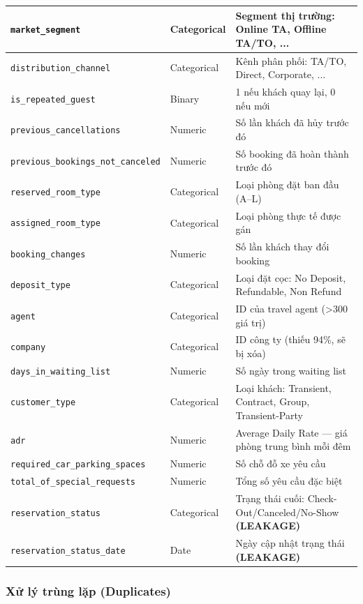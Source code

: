 \documentclass[12pt, a4paper]{article}
\begin{document}
\begin{longtable}{|l|l|p{7cm}|}
\texttt{market\_segment} & Categorical & Segment thị trường: Online TA, Offline TA/TO, ... \\ \hline
\texttt{distribution\_channel} & Categorical & Kênh phân phối: TA/TO, Direct, Corporate, ... \\ \hline
\texttt{is\_repeated\_guest} & Binary & 1 nếu khách quay lại, 0 nếu mới \\ \hline
\texttt{previous\_cancellations} & Numeric & Số lần khách đã hủy trước đó \\ \hline
\texttt{previous\_bookings\_not\_canceled} & Numeric & Số booking đã hoàn thành trước đó \\ \hline
\texttt{reserved\_room\_type} & Categorical & Loại phòng đặt ban đầu (A--L) \\ \hline
\texttt{assigned\_room\_type} & Categorical & Loại phòng thực tế được gán \\ \hline
\texttt{booking\_changes} & Numeric & Số lần khách thay đổi booking \\ \hline
\texttt{deposit\_type} & Categorical & Loại đặt cọc: No Deposit, Refundable, Non Refund \\ \hline
\texttt{agent} & Categorical & ID của travel agent (>300 giá trị) \\ \hline
\texttt{company} & Categorical & ID công ty (thiếu 94\%, sẽ bị xóa) \\ \hline
\texttt{days\_in\_waiting\_list} & Numeric & Số ngày trong waiting list \\ \hline
\texttt{customer\_type} & Categorical & Loại khách: Transient, Contract, Group, Transient-Party \\ \hline
\texttt{adr} & Numeric & Average Daily Rate --- giá phòng trung bình mỗi đêm \\ \hline
\texttt{required\_car\_parking\_spaces} & Numeric & Số chỗ đỗ xe yêu cầu \\ \hline
\texttt{total\_of\_special\_requests} & Numeric & Tổng số yêu cầu đặc biệt \\ \hline
\texttt{reservation\_status} & Categorical & Trạng thái cuối: Check-Out/Canceled/No-Show \textbf{(LEAKAGE)} \\ \hline
\texttt{reservation\_status\_date} & Date & Ngày cập nhật trạng thái \textbf{(LEAKAGE)} \\ \hline
\end{longtable}

\subsubsection{Xử lý trùng lặp (Duplicates)}
\end{document}
